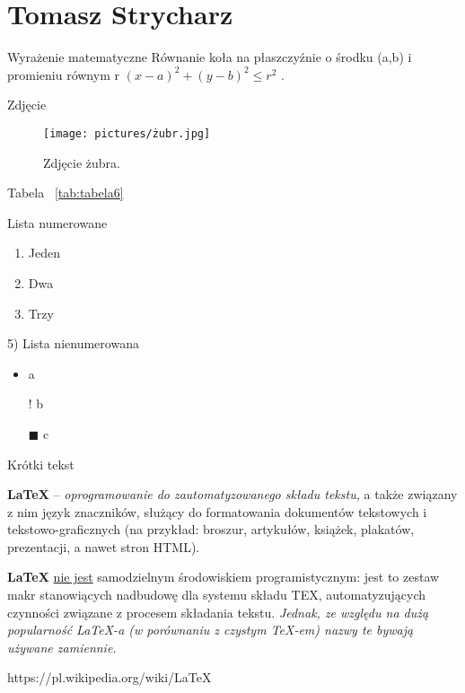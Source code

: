 \section{Tomasz Strycharz}
Wyrażenie matematyczne
Równanie koła na płaszczyźnie o środku (a,b) i promieniu równym r 
\begin{math} (x-a)^2+(y-b)^2 \leq r^2 \end{math} .

Zdjęcie

\begin{figure}[h]
    \centering
    \texttt{[image: pictures/żubr.jpg]}
    \caption{Zdjęcie żubra.}
\end{figure}


Tabela ~\ref{tab:tabela6}



Lista numerowane
\begin{enumerate}
  \item Jeden
  \item Dwa
  \item Trzy
\end{enumerate}
5) Lista nienumerowana
\begin{itemize}
  \item a
  \item[!] b
  \item[$\blacksquare$] c
\end{itemize}

Krótki tekst
\begin{flushleft}
\textbf{LaTeX} – \textit{oprogramowanie do zautomatyzowanego składu tekstu,} a także związany z nim język znaczników, służący do formatowania dokumentów tekstowych i tekstowo-graficznych (na przykład: broszur, artykułów, książek, plakatów, prezentacji, a nawet stron HTML).
\end{flushleft}

\begin{center}
\textbf{LaTeX} \underline{nie jest} samodzielnym środowiskiem programistycznym: jest to zestaw makr stanowiących nadbudowę dla systemu składu TEX, automatyzujących czynności związane z procesem składania tekstu. \emph{Jednak, ze względu na dużą popularność LaTeX-a (w porównaniu z czystym TeX-em) nazwy te bywają używane zamiennie.}
\end{center}
https://pl.wikipedia.org/wiki/LaTeX